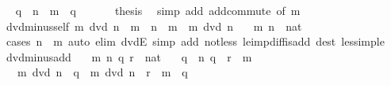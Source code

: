 \begin{isabellebody}
\ \isamarkupfalse%
\ q\ \ {\isachardoublequoteopen}n\ {\isacharequal}{\kern0pt}\ m\ {\isacharplus}{\kern0pt}\ q{\isachardoublequoteclose}\ \isacommand{{\isachardot}{\kern0pt}{\isachardot}{\kern0pt}}\isamarkupfalse%
\isanewline
\ \ \isamarkupfalse%
\ \isamarkupfalse%
\ {\isacharquery}{\kern0pt}thesis\ \isamarkupfalse%
\ {\isacharparenleft}{\kern0pt}simp\ add{\isacharcolon}{\kern0pt}\ add{\isachardot}{\kern0pt}commute\ {\isacharbrackleft}{\kern0pt}of\ m{\isacharbrackright}{\kern0pt}{\isacharparenright}{\kern0pt}\isanewline
{}\isamarkupfalse%
%
\endisatagproof
{\isafoldproof}%
%
\isadelimproof
\isanewline
%
\endisadelimproof
\isanewline
{}\isamarkupfalse%
\ dvd{\isacharunderscore}{\kern0pt}minus{\isacharunderscore}{\kern0pt}self{\isacharcolon}{\kern0pt}\ {\isachardoublequoteopen}m\ dvd\ n\ {\isacharminus}{\kern0pt}\ m\ {\isasymlongleftrightarrow}\ n\ {\isacharless}{\kern0pt}\ m\ {\isasymor}\ m\ dvd\ n{\isachardoublequoteclose}\isanewline
\ \ \ m\ n\ {\isacharcolon}{\kern0pt}{\isacharcolon}{\kern0pt}\ nat\isanewline
%
\isadelimproof
\ \ %
\endisadelimproof
%
\isatagproof
{}\isamarkupfalse%
\ {\isacharparenleft}{\kern0pt}cases\ {\isachardoublequoteopen}n\ {\isacharless}{\kern0pt}\ m{\isachardoublequoteclose}{\isacharparenright}{\kern0pt}\ {\isacharparenleft}{\kern0pt}auto\ elim{\isacharbang}{\kern0pt}{\isacharcolon}{\kern0pt}\ dvdE\ simp\ add{\isacharcolon}{\kern0pt}\ not{\isacharunderscore}{\kern0pt}less\ le{\isacharunderscore}{\kern0pt}imp{\isacharunderscore}{\kern0pt}diff{\isacharunderscore}{\kern0pt}is{\isacharunderscore}{\kern0pt}add\ dest{\isacharcolon}{\kern0pt}\ less{\isacharunderscore}{\kern0pt}imp{\isacharunderscore}{\kern0pt}le{\isacharparenright}{\kern0pt}%
\endisatagproof
{\isafoldproof}%
%
\isadelimproof
\isanewline
%
\endisadelimproof
\isanewline
{}\isamarkupfalse%
\ dvd{\isacharunderscore}{\kern0pt}minus{\isacharunderscore}{\kern0pt}add{\isacharcolon}{\kern0pt}\isanewline
\ \ \ m\ n\ q\ r\ {\isacharcolon}{\kern0pt}{\isacharcolon}{\kern0pt}\ nat\isanewline
\ \ \ {\isachardoublequoteopen}q\ {\isasymle}\ n{\isachardoublequoteclose}\ {\isachardoublequoteopen}q\ {\isasymle}\ r\ {\isacharasterisk}{\kern0pt}\ m{\isachardoublequoteclose}\isanewline
\ \ \ {\isachardoublequoteopen}m\ dvd\ n\ {\isacharminus}{\kern0pt}\ q\ {\isasymlongleftrightarrow}\ m\ dvd\ n\ {\isacharplus}{\kern0pt}\ {\isacharparenleft}{\kern0pt}r\ {\isacharasterisk}{\kern0pt}\ m\ {\isacharminus}{\kern0pt}\ q{\isacharparenright}{\kern0pt}{\isachardoublequoteclose}\isanewline

\end{isabellebody}
